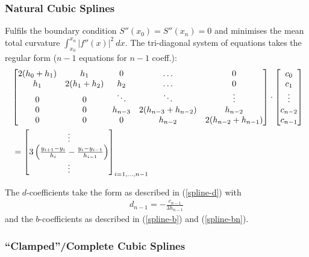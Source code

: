\subsubsection{Natural Cubic Splines}
Fulfils the boundary condition $S''(x_0)=S''(x_n)=0$ and minimises the mean total curvature
$\int_{x_0}^{x_n}|f''(x)|^2\ dx$.
The tri-diagonal system of equations takes the regular form ($n-1$ equations for $n-1$ coeff.):
\begin{align*}
    \ & \resizebox{\columnwidth}{!}{$
    \begin{bmatrix}
        2(h_0 + h_1) & h_1          & 0       & \hdots               & 0                    \\
        h_1          & 2(h_1 + h_2) & h_2     & \hdots               & 0                    \\
        0            & 0            & \ddots  & \ddots               & \vdots               \\
        0            & 0            & h_{n-3} & 2(h_{n-3} + h_{n-2}) & h_{n-2}              \\
        0            & 0            & 0       & h_{n-2}              & 2(h_{n-2} + h_{n-1})
    \end{bmatrix}\cdot
    \begin{bmatrix}
        c_0     \\
        c_1     \\
        \vdots  \\
        c_{n-2} \\
        c_{n-1}
    \end{bmatrix}
    $} \\
    \ & =
    \begin{bmatrix}
        \vdots                                                                \\
        3\left(\frac{y_{i+1} - y_i}{h_i}-\frac{y_i - y_{i-1}}{h_{i-1}}\right) \\
        \vdots
    \end{bmatrix}_{i=1,\ldots,n-1}
\end{align*}

The $d$-coefficients take the form as described in (\ref{spline-d}) with
\begin{align}
    \label{spline-dn}
    d_{n-1} = -\frac{c_{n-1}}{3h_{n-1}}
\end{align}
and the $b$-coefficients as described in (\ref{spline-b}) and (\ref{spline-bn}).

\subsubsection{``Clamped''/Complete Cubic Splines}

